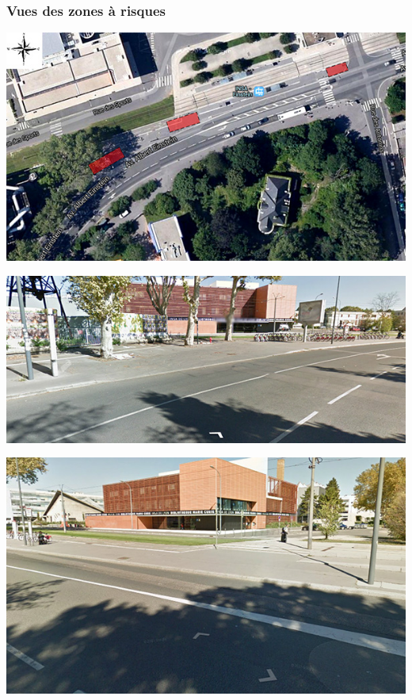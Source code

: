 \documentclass[hidelinks, paper=a4, fontsize=13pt]{report}
\begin{document}
\subsubsection{Vues des zones à risques}
\begin{center}
	\includegraphics[scale=0.8]{Annexes/Images/zoneARisque}
\end{center}
\begin{center}
	\includegraphics[scale=0.8]{Annexes/Images/zoneARisque2}
\end{center}
\begin{center}
	\includegraphics[scale=0.7]{Annexes/Images/zoneARisque3}
\end{center}
\end{document}
